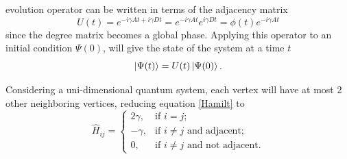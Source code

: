 \documentclass[../../dissertation.tex]{subfiles}
\begin{document}
evolution operator can be written in terms of the adjacency matrix 
\begin{equation}
	U(t) = e^{-i\gamma A t + i\gamma D t} = e^{-i\gamma A t} e^{i\gamma D t} = \phi(t) e^{-i\gamma A t} 
	\label{eq:contSimulUniOp}
\end{equation}
since the degree matrix becomes a global phase.
Applying this operator to an initial condition $\Psi(0)$, will give the state
of the system at a time $t$
\begin{equation}
	\ket{\Psi(t)} = U(t)\ket{\Psi(0)}.
\end{equation}\par

Considering a uni-dimensional quantum system, each vertex
will have at most 2 other neighboring vertices, reducing equation \ref{Hamilt}
to
\begin{equation}
	\hat{H}_{ij} = \begin{cases} 
		2\gamma, & \mbox{if } i= j; \\ 
		-\gamma, & \mbox{if } i\neq j\mbox{ and adjacent};\\
		0, & \mbox{if } i\neq j\mbox{ and not adjacent}.
	\end{cases}
\end{equation}\par
\end{document}
